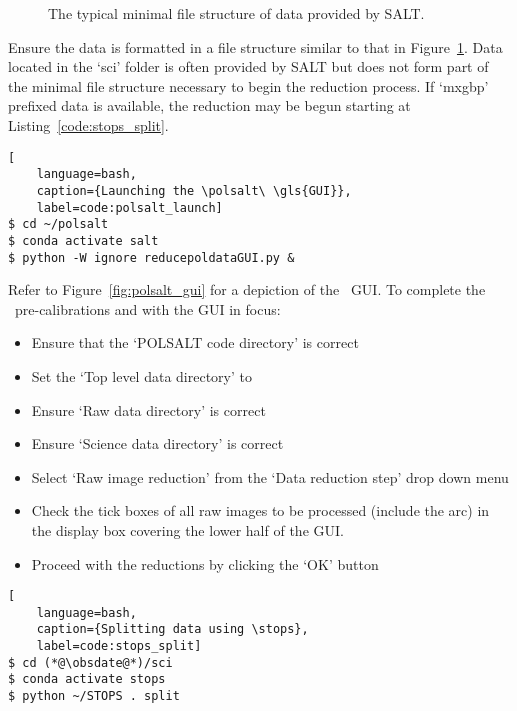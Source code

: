 \begin{figure}[h!]
    \centering
    \begin{minipage}{8cm}
    \end{minipage}
    \caption{The typical minimal file structure of data provided by \gls{SALT}.}
    \label{dir:pre_red}
\end{figure}

Ensure the data is formatted in a file structure similar to that in Figure~\ref{dir:pre_red}. Data located in the `sci' folder is often provided by \gls{SALT} but does not form part of the minimal file structure necessary to begin the reduction process. If `mxgbp' prefixed data is available, the reduction may be begun starting at Listing~\ref{code:stops_split}.

\begin{lstlisting}[
    language=bash,
    caption={Launching the \polsalt\ \gls{GUI}},
    label=code:polsalt_launch]
$ cd ~/polsalt
$ conda activate salt
$ python -W ignore reducepoldataGUI.py &
\end{lstlisting}

Refer to Figure~\ref{fig:polsalt_gui} for a depiction of the \polsalt\ \gls{GUI}. To complete the \polsalt\ pre-calibrations and with the \gls{GUI} in focus:
\begin{itemize}
    \item Ensure that the `POLSALT code directory' is correct
    \item Set the `Top level data directory' to \obsdate
    \item Ensure `Raw data directory' is correct
    \item Ensure `Science data directory' is correct
    \item Select `Raw image reduction' from the `Data reduction step' drop down menu
    \item Check the tick boxes of all raw images to be processed (include the arc) in the display box covering the lower half of the \gls{GUI}.
    \item Proceed with the reductions by clicking the `OK' button
\end{itemize}

\begin{lstlisting}[
    language=bash,
    caption={Splitting data using \stops},
    label=code:stops_split]
$ cd (*@\obsdate@*)/sci
$ conda activate stops
$ python ~/STOPS . split
\end{lstlisting}

